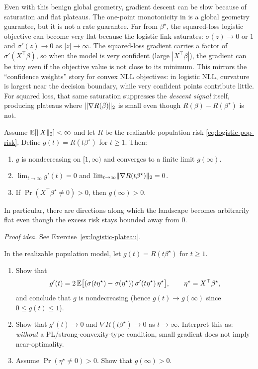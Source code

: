 \documentclass[11pt]{article}
\begin{document}
Even with this benign global geometry, gradient descent can be slow because of saturation and flat plateaus.
The one-point monotonicity in  is a global geometry guarantee, but it is not a rate guarantee.
Far from $\beta^\star$, the squared-loss logistic objective can become very flat because the logistic link saturates:
$\sigma(z)\to 0$ or $1$ and $\sigma'(z)\to 0$ as $|z|\to\infty$.
The squared-loss gradient carries a factor of $\sigma'(X^\top\beta)$, so when the model is very confident (large $|X^\top\beta|$), the gradient can be tiny even if the objective value is not close to its minimum.
This mirrors the ``confidence weights'' story for convex NLL objectives:
in logistic NLL, curvature is largest near the decision boundary, while very confident points contribute little.
For squared loss, that same saturation suppresses the \emph{descent signal} itself, producing plateaus where $\lVert\nabla R(\beta)\rVert_2$ is small even though $R(\beta)-R(\beta^\star)$ is not.

\begin{proposition}
\label{prop:logistic-pop-flat}
Assume $\mathbb{E}[\lVert X\rVert_2]<\infty$ and let $R$ be the realizable population risk \eqref{eq:logistic-pop-risk}.
Define $g(t)=R(t\beta^\star)$ for $t\ge 1$.
Then:
\begin{enumerate}[leftmargin=*]
  \item $g$ is nondecreasing on $[1,\infty)$ and converges to a finite limit $g(\infty)$.
  \item $\lim_{t\to\infty} g'(t)=0$ and $\lim_{t\to\infty}\lVert\nabla R(t\beta^\star)\rVert_2=0$.
  \item If $\Pr(X^\top\beta^\star\neq 0)>0$, then $g(\infty)>0$.
\end{enumerate}
In particular, there are directions along which the landscape becomes arbitrarily flat even though the excess risk stays bounded away from $0$.
\end{proposition}

\emph{Proof idea.} See Exercise~\ref{ex:logistic-plateau}.

\begin{exercise}
\label{ex:logistic-plateau}
In the realizable population model, let $g(t)=R(t\beta^\star)$ for $t\ge 1$.
\begin{enumerate}[leftmargin=*]
  \item Show that
  \[
    g'(t)=2\,\mathbb{E}\big[(\sigma(t\eta^\star)-\sigma(\eta^\star))\,\sigma'(t\eta^\star)\,\eta^\star\big],
    \qquad \eta^\star=X^\top\beta^\star,
  \]
  and conclude that $g$ is nondecreasing (hence $g(t)\to g(\infty)$ since $0\le g(t)\le 1$).
  \item Show that $g'(t)\to 0$ and $\nabla R(t\beta^\star)\to 0$ as $t\to\infty$.
  Interpret this as: \emph{without} a PL/strong-convexity-type condition, small gradient does not imply near-optimality.
  \item Assume $\Pr(\eta^\star\neq 0)>0$.
  Show that $g(\infty)>0$.
\end{enumerate}
\end{exercise}
\end{document}
